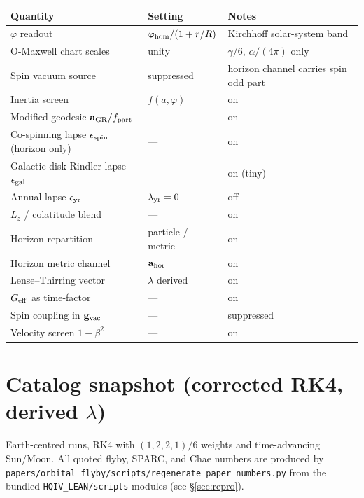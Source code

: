 \documentclass[11pt]{amsart}
\begin{document}
\begin{center}
\begin{tabular}{@{}lll@{}}
\toprule
Quantity & Setting & Notes \\
\midrule
$\varphi$ readout & $\varphi_{\rm hom}/(1+r/R)$ & Kirchhoff solar-system band \\
O-Maxwell chart scales & unity & $\gamma/6$, $\alpha/(4\pi)$ only \\
Spin vacuum source & suppressed & horizon channel carries spin odd part \\
\midrule
Inertia screen & $f(a,\varphi)$ & on \\
Modified geodesic $\mathbf a_{\rm GR}/f_{\rm part}$ & --- & on \\
Co-spinning lapse $\epsilon_{\rm spin}$ (horizon only) & --- & on \\
Galactic disk Rindler lapse $\epsilon_{\rm gal}$ & --- & on (tiny) \\
Annual lapse $\epsilon_{\rm yr}$ & $\lambda_{\rm yr}=0$ & off \\
$L_z$ / colatitude blend & --- & on \\
Horizon repartition & particle / metric & on \\
Horizon metric channel & $\mathbf a_{\rm hor}$ & on \\
Lense--Thirring vector & $\lambda$ derived & on \\
$G_{\rm eff}$ as time-factor & --- & on \\
Spin coupling in $\mathbf g_{\rm vac}$ & --- & suppressed \\
Velocity screen $1-\beta^2$ & --- & on \\
\bottomrule
\end{tabular}
\end{center}

\section{Catalog snapshot (corrected RK4, derived $\lambda$)}\label{sec:results}

Earth-centred runs, RK4 with $(1,2,2,1)/6$ weights and time-advancing Sun/Moon.
All quoted flyby, SPARC, and Chae numbers are produced by
\texttt{papers/orbital\_flyby/scripts/regenerate\_paper\_numbers.py} from the bundled
\texttt{HQIV\_LEAN/scripts} modules (see \S\ref{sec:repro}).

\end{document}
